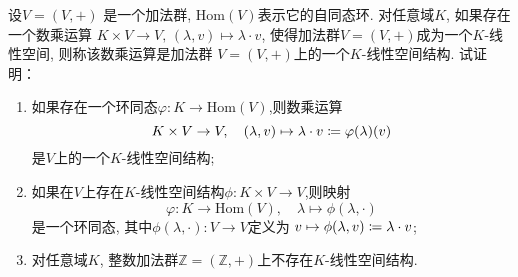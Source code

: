 \begin{problem}\label{ex:1.4.13}
    设$V = (V, +)$ 是一个加法群, $\mathrm{Hom}(V)$表示它的自同态环.
对任意域$K$, 如果存在一个数乘运算
$K \times V \to V,\, (\lambda,v) \mapsto \lambda \cdot v$,
使得加法群$V = (V, +)$成为一个$K$-线性空间, 则称该数乘运算是加法群
$V = (V, +)$上的一个$K$-线性空间结构. 试证明：
\begin{enumerate}[(1)]
    \item 如果存在一个环同态$\varphi:K \to \mathrm{Hom}(V)$,则数乘运算
\[
    K \times V \to V,\quad (\lambda, v) \mapsto \lambda \cdot v \mathrel{\coloneqq} \varphi(\lambda)(v)
\]
是$V$上的一个$K$-线性空间结构;
    \item 如果在$V$上存在$K$-线性空间结构$\phi:K \times V \to V$,则映射
\[
    \varphi:K \to \mathrm{Hom}(V),\quad \lambda \mapsto \phi(\lambda, \cdot)
\]
是一个环同态, 其中$\phi(\lambda, \cdot):V \to V$定义为
$v \mapsto \phi(\lambda, v) \mathrel{\coloneqq} \lambda \cdot v$;
    \item 对任意域$K$, 整数加法群$\mathbb{Z} = (\mathbb{Z}, +)$上不存在$K$-线性空间结构.
\end{enumerate}
\end{problem}

